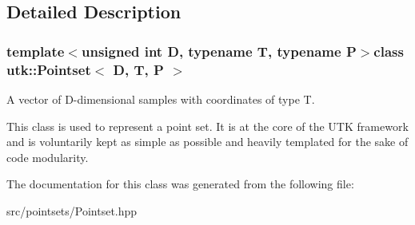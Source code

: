\subsection{Detailed Description}
\subsubsection*{template$<$unsigned int D, typename T, typename P$>$class utk\-::\-Pointset$<$ D, T, P $>$}

A vector of D-\/dimensional samples with coordinates of type T. 

This class is used to represent a point set. It is at the core of the U\-T\-K framework and is voluntarily kept as simple as possible and heavily templated for the sake of code modularity. 

The documentation for this class was generated from the following file\-:\begin{DoxyCompactItemize}
\item 
src/pointsets/Pointset.\-hpp\end{DoxyCompactItemize}
